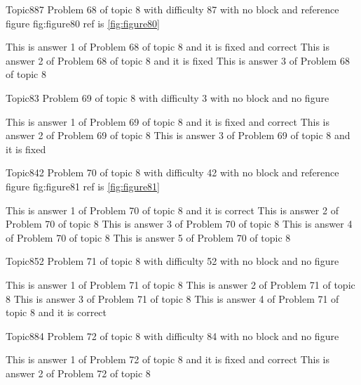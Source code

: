 \documentclass[master]{exam}
\begin{document}
\begin{problem}{Topic8}{87}
	Problem 68 of topic 8 with difficulty 87 with no block and reference figure fig:figure80 ref is \ref{fig:figure80}
	\begin{answers}
		 This is answer 1 of Problem 68 of topic 8 and it is fixed and correct
		\answer[fixed] This is answer 2 of Problem 68 of topic 8 and it is fixed
		\answer This is answer 3 of Problem 68 of topic 8 
	\end{answers}
\end{problem}

\begin{problem}{Topic8}{3}
	Problem 69 of topic 8 with difficulty 3 with no block and no figure
	\begin{answers}
		 This is answer 1 of Problem 69 of topic 8 and it is fixed and correct
		\answer This is answer 2 of Problem 69 of topic 8 
		\answer[fixed] This is answer 3 of Problem 69 of topic 8 and it is fixed
	\end{answers}
\end{problem}

\begin{problem}{Topic8}{42}
	Problem 70 of topic 8 with difficulty 42 with no block and reference figure fig:figure81 ref is \ref{fig:figure81}
	\begin{answers}
		\answer[correct] This is answer 1 of Problem 70 of topic 8 and it is correct
		\answer This is answer 2 of Problem 70 of topic 8 
		\answer This is answer 3 of Problem 70 of topic 8 
		\answer This is answer 4 of Problem 70 of topic 8 
		\answer This is answer 5 of Problem 70 of topic 8 
	\end{answers}
\end{problem}

\begin{problem}{Topic8}{52}
	Problem 71 of topic 8 with difficulty 52 with no block and no figure
	\begin{answers}
		\answer This is answer 1 of Problem 71 of topic 8 
		\answer This is answer 2 of Problem 71 of topic 8 
		\answer This is answer 3 of Problem 71 of topic 8 
		\answer[correct] This is answer 4 of Problem 71 of topic 8 and it is correct
	\end{answers}
\end{problem}

\begin{problem}{Topic8}{84}
	Problem 72 of topic 8 with difficulty 84 with no block and no figure
	\begin{answers}
		 This is answer 1 of Problem 72 of topic 8 and it is fixed and correct
		\answer This is answer 2 of Problem 72 of topic 8 
	\end{answers}
\end{problem}
\end{document}
